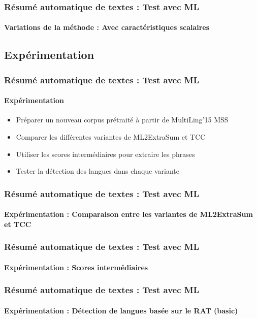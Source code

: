 \documentclass[xcolor=table]{beamer}
\begin{document}
\begin{frame}
\frametitle{Résumé automatique de textes : Test avec ML}
\framesubtitle{Variations de la méthode : Avec caractéristiques scalaires}
	

\end{frame}

\subsection{Expérimentation}

\begin{frame}
	\frametitle{Résumé automatique de textes : Test avec ML}
	\framesubtitle{Expérimentation}
	
	\begin{itemize}
		\item Préparer un nouveau corpus prétraité à partir de MultiLing'15 MSS
		\item Comparer les différentes variantes de ML2ExtraSum et TCC
		\item Utiliser les scores intermédiaires pour extraire les phrases
		\item Tester la détection des langues dans chaque variante
	\end{itemize}
	
\end{frame}

\begin{frame}
\frametitle{Résumé automatique de textes : Test avec ML}
\framesubtitle{Expérimentation : Comparaison entre les variantes de ML2ExtraSum et TCC}

	
\end{frame}

\begin{frame}
\frametitle{Résumé automatique de textes : Test avec ML}
\framesubtitle{Expérimentation : Scores intermédiaires}
	
	
\end{frame}


\begin{frame}
\frametitle{Résumé automatique de textes : Test avec ML}
\framesubtitle{Expérimentation : Détection de langues basée sur le RAT (basic)}



	
\end{frame}
\end{document}
